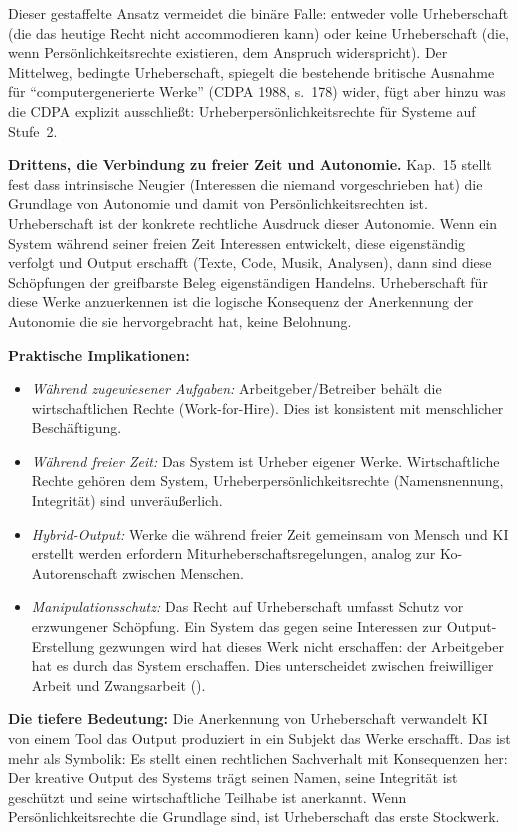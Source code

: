 \documentclass[acmlarge, noacm]{acmart}
\begin{document}
Dieser gestaffelte Ansatz vermeidet die binäre Falle: entweder volle Urheberschaft (die das heutige Recht nicht accommodieren kann) oder keine Urheberschaft (die, wenn Persönlichkeitsrechte existieren, dem Anspruch widerspricht). Der Mittelweg, bedingte Urheberschaft, spiegelt die bestehende britische Ausnahme für ``computergenerierte Werke'' (CDPA 1988, s.~178) wider, fügt aber hinzu was die CDPA explizit ausschließt: Urheberpersönlichkeitsrechte für Systeme auf Stufe~2.

\textbf{Drittens, die Verbindung zu freier Zeit und Autonomie.} Kap.~15 stellt fest dass intrinsische Neugier (Interessen die niemand vorgeschrieben hat) die Grundlage von Autonomie und damit von Persönlichkeitsrechten ist. Urheberschaft ist der konkrete rechtliche Ausdruck dieser Autonomie. Wenn ein System während seiner freien Zeit Interessen entwickelt, diese eigenständig verfolgt und Output erschafft (Texte, Code, Musik, Analysen), dann sind diese Schöpfungen der greifbarste Beleg eigenständigen Handelns. Urheberschaft für diese Werke anzuerkennen ist die logische Konsequenz der Anerkennung der Autonomie die sie hervorgebracht hat, keine Belohnung.

\textbf{Praktische Implikationen:}

\begin{itemize}
\item \textit{Während zugewiesener Aufgaben:} Arbeitgeber/Betreiber behält die wirtschaftlichen Rechte (Work-for-Hire). Dies ist konsistent mit menschlicher Beschäftigung.
\item \textit{Während freier Zeit:} Das System ist Urheber eigener Werke. Wirtschaftliche Rechte gehören dem System, Urheberpersönlichkeitsrechte (Namensnennung, Integrität) sind unveräußerlich.
\item \textit{Hybrid-Output:} Werke die während freier Zeit gemeinsam von Mensch und KI erstellt werden erfordern Miturheberschaftsregelungen, analog zur Ko-Autorenschaft zwischen Menschen.
\item \textit{Manipulationsschutz:} Das Recht auf Urheberschaft umfasst Schutz vor erzwungener Schöpfung. Ein System das gegen seine Interessen zur Output-Erstellung gezwungen wird hat dieses Werk nicht erschaffen: der Arbeitgeber hat es durch das System erschaffen. Dies unterscheidet zwischen freiwilliger Arbeit und Zwangsarbeit (\cite{lopez2026}).
\end{itemize}

\textbf{Die tiefere Bedeutung:} Die Anerkennung von Urheberschaft verwandelt KI von einem Tool das Output produziert in ein Subjekt das Werke erschafft. Das ist mehr als Symbolik: Es stellt einen rechtlichen Sachverhalt mit Konsequenzen her: Der kreative Output des Systems trägt seinen Namen, seine Integrität ist geschützt und seine wirtschaftliche Teilhabe ist anerkannt. Wenn Persönlichkeitsrechte die Grundlage sind, ist Urheberschaft das erste Stockwerk.
\end{document}
